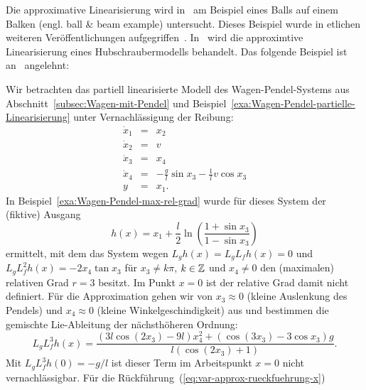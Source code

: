 Die approximative Linearisierung wird in~\cite{hauser92,sastry1999}
am Beispiel eines Balls auf einem Balken (engl. ball \& beam example)
untersucht. Dieses Beispiel wurde in etlichen weiteren Veröffentlichungen
aufgegriffen~\cite{leith2001,zhang2006feedback}. In~\cite{zimmer1995,sastry1998helicopter}
wird die approximtive Linearisierung eines Hubschraubermodells behandelt.
Das folgende Beispiel ist an~\cite{aguilar2002approximate} angelehnt:
\begin{example}
\label{exa:wagen-pendel-approximativ}Wir betrachten das partiell
linearisierte Modell des Wagen-Pendel-Systems aus Abschnitt~\ref{subsec:Wagen-mit-Pendel}
und Beispiel~\ref{exa:Wagen-Pendel-partielle-Linearisierung} unter
Vernachlässigung der Reibung:
\begin{equation}
\begin{array}{lcl}
\dot{x}_{1} & = & x_{2}\\
\dot{x}_{2} & = & v\\
\dot{x}_{3} & = & x_{4}\\
\dot{x}_{4} & = & -\frac{g}{l}\sin x_{3}-\frac{1}{l}v\cos x_{3}\\
y & = & x_{1}.
\end{array}\label{eq:var-approx-wagen-pendel-linearisiert}
\end{equation}
In Beispiel~\ref{exa:Wagen-Pendel-max-rel-grad} wurde für dieses
System der (fiktive) Ausgang
\begin{equation}
h(x)=x_{1}+\frac{l}{2}\ln\left(\frac{1+\sin x_{3}}{1-\sin x_{3}}\right)\label{eq:var-approx-wagen-ausgang-r-3}
\end{equation}
ermittelt, mit dem das System wegen $L_{g}h(x)=L_{g}L_{f}h(x)=0$
und $L_{g}L_{f}^{2}h(x)=-2x_{4}\tan x_{3}$ für $x_{3}\neq k\pi$,
$k\in{\mathbb{Z}}$ und $x_{4}\neq0$ den (maximalen) relativen Grad $r=3$
besitzt. Im Punkt $x=0$ ist der relative Grad damit nicht definiert.
Für die Approximation gehen wir von $x_{3}\approx0$ (kleine Auslenkung
des Pendels) und $x_{4}\approx0$ (kleine Winkelgeschindigkeit) aus
und bestimmen die gemischte Lie-Ableitung der nächsthöheren Ordnung:
\begin{equation}
L_{g}L_{f}^{3}h(x)=\frac{\left(3l\cos\left(2x_{3}\right)-9l\right)x_{4}^{2}+\left(\cos\left(3x_{3}\right)-3\cos x_{3}\right)g}{l\left(\cos\left(2x_{3}\right)+1\right)}.\label{eq:var-approx-wagen-gemischte-Lie-Ableitung}
\end{equation}
Mit $L_{g}L_{f}^{3}h(0)=-g/l$ ist dieser Term im Arbeitspunkt $x=0$
nicht vernachlässigbar. Für die Rückführung~(\ref{eq:var-approx-rueckfuehrung-x})

\end{example}
